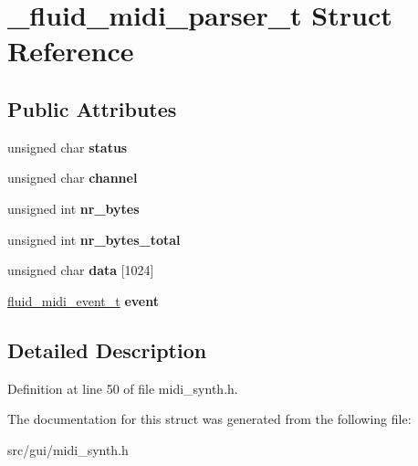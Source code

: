 \hypertarget{struct__fluid__midi__parser__t}{\section{\-\_\-fluid\-\_\-midi\-\_\-parser\-\_\-t Struct Reference}
\label{struct__fluid__midi__parser__t}
}
\subsection*{Public Attributes}
\begin{DoxyCompactItemize}
\item 
\hypertarget{struct__fluid__midi__parser__t_a32006b8e0b4a5acc3781753e682f70d3}{unsigned char {\bfseries status}}\label{struct__fluid__midi__parser__t_a32006b8e0b4a5acc3781753e682f70d3}

\item 
\hypertarget{struct__fluid__midi__parser__t_adc9286927514faff96288f3458c898cf}{unsigned char {\bfseries channel}}\label{struct__fluid__midi__parser__t_adc9286927514faff96288f3458c898cf}

\item 
\hypertarget{struct__fluid__midi__parser__t_ad0106e994167162f1554186d345ae222}{unsigned int {\bfseries nr\-\_\-bytes}}\label{struct__fluid__midi__parser__t_ad0106e994167162f1554186d345ae222}

\item 
\hypertarget{struct__fluid__midi__parser__t_a5cb62ed4894d4d2926150b9f9434e477}{unsigned int {\bfseries nr\-\_\-bytes\-\_\-total}}\label{struct__fluid__midi__parser__t_a5cb62ed4894d4d2926150b9f9434e477}

\item 
\hypertarget{struct__fluid__midi__parser__t_a4f7420b794eab6d304aeb98444dfc54e}{unsigned char {\bfseries data} \mbox{[}1024\mbox{]}}\label{struct__fluid__midi__parser__t_a4f7420b794eab6d304aeb98444dfc54e}

\item 
\hypertarget{struct__fluid__midi__parser__t_a0ba50c10a405a0fb3c5125e154d2ba34}{\hyperlink{struct__fluid__midi__event__t}{fluid\-\_\-midi\-\_\-event\-\_\-t} {\bfseries event}}\label{struct__fluid__midi__parser__t_a0ba50c10a405a0fb3c5125e154d2ba34}

\end{DoxyCompactItemize}


\subsection{Detailed Description}


Definition at line 50 of file midi\-\_\-synth.\-h.



The documentation for this struct was generated from the following file\-:\begin{DoxyCompactItemize}
\item 
src/gui/midi\-\_\-synth.\-h\end{DoxyCompactItemize}

